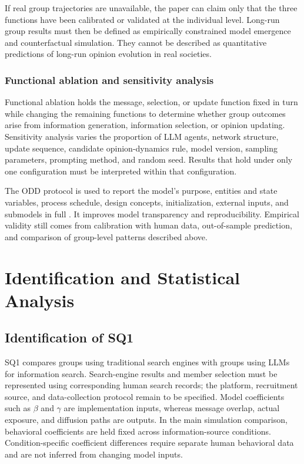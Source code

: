 \documentclass[11pt,a4paper]{article}
\begin{document}
If real group trajectories are unavailable, the paper can claim only that the three functions have been calibrated or validated at the individual level. Long-run group results must then be defined as empirically constrained model emergence and counterfactual simulation. They cannot be described as quantitative predictions of long-run opinion evolution in real societies.

\subsubsection{Functional ablation and sensitivity analysis}

Functional ablation holds the message, selection, or update function fixed in turn while changing the remaining functions to determine whether group outcomes arise from information generation, information selection, or opinion updating. Sensitivity analysis varies the proportion of LLM agents, network structure, update sequence, candidate opinion-dynamics rule, model version, sampling parameters, prompting method, and random seed. Results that hold under only one configuration must be interpreted within that configuration.

The ODD protocol is used to report the model's purpose, entities and state variables, process schedule, design concepts, initialization, external inputs, and submodels in full \cite{grimm2020}. It improves model transparency and reproducibility. Empirical validity still comes from calibration with human data, out-of-sample prediction, and comparison of group-level patterns described above.

\section{Identification and Statistical Analysis}

\subsection{Identification of SQ1}

SQ1 compares groups using traditional search engines with groups using LLMs for information search. Search-engine results and member selection must be represented using corresponding human search records; the platform, recruitment source, and data-collection protocol remain to be specified. Model coefficients such as $\beta$ and $\gamma$ are implementation inputs, whereas message overlap, actual exposure, and diffusion paths are outputs. In the main simulation comparison, behavioral coefficients are held fixed across information-source conditions. Condition-specific coefficient differences require separate human behavioral data and are not inferred from changing model inputs.
\end{document}
